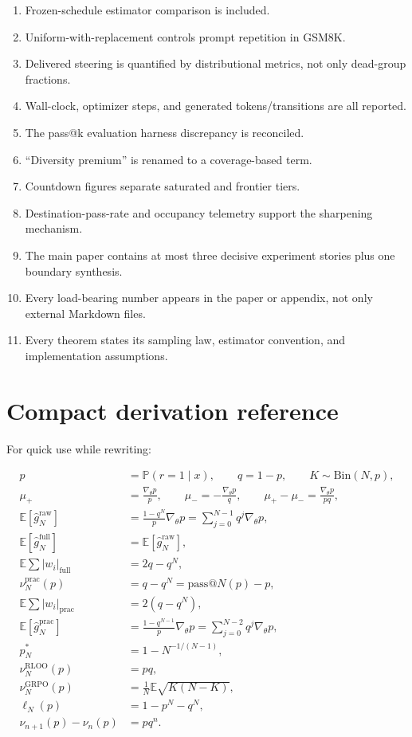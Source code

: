 \documentclass[11pt]{article}
\makeatletter
\newcommand{\E}{\mathbb{E}}
\newcommand{\Prb}{\mathbb{P}}
\newcommand{\grad}{\nabla_{\!\theta}}
\newcommand{\PassAt}[1]{\mathrm{pass@}#1}
\theoremstyle{definition}
\theoremstyle{remark}
\makeatother
\begin{document}
\begin{enumerate}[leftmargin=2em,label=$\square$]
\item Frozen-schedule estimator comparison is included.
\item Uniform-with-replacement controls prompt repetition in GSM8K.
\item Delivered steering is quantified by distributional metrics, not only dead-group fractions.
\item Wall-clock, optimizer steps, and generated tokens/transitions are all reported.
\item The pass@k evaluation harness discrepancy is reconciled.
\item ``Diversity premium'' is renamed to a coverage-based term.
\item Countdown figures separate saturated and frontier tiers.
\item Destination-pass-rate and occupancy telemetry support the sharpening mechanism.
\item The main paper contains at most three decisive experiment stories plus one boundary synthesis.
\item Every load-bearing number appears in the paper or appendix, not only external Markdown files.
\item Every theorem states its sampling law, estimator convention, and implementation assumptions.
\end{enumerate}

\appendix

\section{Compact derivation reference}

For quick use while rewriting:

\begin{align*}
p&=\Prb(r=1\mid x),\qquad q=1-p,\qquad K\sim\mathrm{Bin}(N,p),\\
\mu_+&=\frac{\grad p}{p},\qquad
\mu_-=-\frac{\grad p}{q},\qquad
\mu_+-\mu_-=\frac{\grad p}{pq},\\
\E[\widehat g_N^{\mathrm{raw}}]
&=\frac{1-q^N}{p}\grad p
=\sum_{j=0}^{N-1}q^j\grad p,\\
\E[\widehat g_N^{\mathrm{full}}]
&=\E[\widehat g_N^{\mathrm{raw}}],\\
\E\sum|w_i|_{\mathrm{full}}
&=2q-q^N,\\
\nu_N^{\mathrm{prac}}(p)
&=q-q^N=\PassAt{N}(p)-p,\\
\E\sum|w_i|_{\mathrm{prac}}
&=2(q-q^N),\\
\E[\widehat g_N^{\mathrm{prac}}]
&=\frac{1-q^{N-1}}{p}\grad p
=\sum_{j=0}^{N-2}q^j\grad p,\\
p_N^*&=1-N^{-1/(N-1)},\\
\nu_N^{\mathrm{RLOO}}(p)&=pq,\\
\nu_N^{\mathrm{GRPO}}(p)
&=\frac1N\E\sqrt{K(N-K)},\\
\ell_N(p)&=1-p^N-q^N,\\
\nu_{n+1}(p)-\nu_n(p)&=pq^n.
\end{align*}
\end{document}
